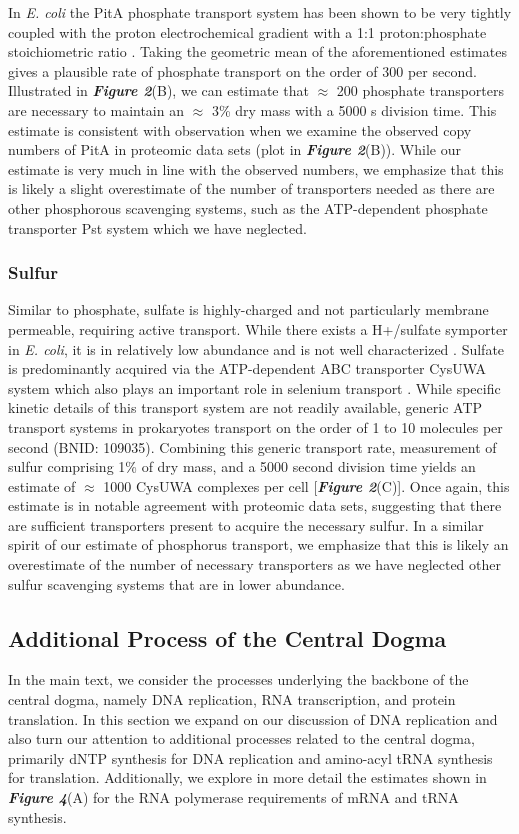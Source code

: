 In \textit{E. coli} the PitA phosphate transport system has been shown to be
very tightly coupled with the proton electrochemical gradient with a 1:1
proton:phosphate stoichiometric ratio \citep{harris2001, feist2007}. Taking the
geometric mean of the aforementioned estimates gives a plausible rate of
phosphate transport on the order of 300  per second. Illustrated in
\textbf{\textit{Figure 2}}(B), we can estimate that $\approx$ 200 phosphate
transporters are necessary to maintain an $\approx$ 3\% dry mass with a 5000 s
division time. This estimate is consistent with observation when we examine the
observed copy numbers of PitA in proteomic data sets (plot in
\textbf{\textit{Figure 2}}(B)). While our estimate is very much in line with the
observed numbers, we emphasize that this is likely a slight overestimate of the
number of transporters needed as there are other phosphorous scavenging systems,
such as the ATP-dependent phosphate transporter Pst system which we have
neglected.

\subsubsection{Sulfur}
Similar to phosphate, sulfate is highly-charged and not particularly membrane
permeable, requiring active transport. While there exists a H+/sulfate
symporter in \textit{E. coli}, it is in relatively low abundance and is not
well characterized \citep{zhang2014}. Sulfate is predominantly acquired via
the ATP-dependent ABC transporter CysUWA system which also plays an important
role in selenium transport \citep{sekowska2000, sirko1995}. While specific
kinetic details of this transport system are not readily available, generic
ATP transport systems in prokaryotes transport on the order of 1 to 10
molecules per second (BNID: 109035). Combining this generic transport rate,
measurement of sulfur comprising 1\% of dry mass, and a 5000 second division
time yields an estimate of $\approx$ 1000 CysUWA complexes per cell
[\textbf{\textit{Figure 2}}(C)]. Once again, this estimate is in notable
agreement with proteomic data sets, suggesting that there are sufficient
transporters present to acquire the necessary sulfur. In a similar spirit of
our estimate of phosphorus transport, we emphasize that this is likely an
overestimate of the number of necessary transporters as we have neglected
other sulfur scavenging systems that are in lower abundance.



\subsection{Additional Process of the Central Dogma}
\label{sec:SI_central_dogma}
In the main text, we consider the processes underlying the backbone of the
central dogma, namely DNA replication, RNA transcription, and protein
translation. In this section we expand on our discussion of DNA replication and also
turn our attention to additional processes
related to the central dogma, primarily dNTP synthesis for DNA replication and
amino-acyl tRNA synthesis for translation. Additionally, we explore in more
detail the estimates shown in \textbf{\textit{Figure 4}}(A) for the RNA polymerase
requirements of mRNA and tRNA synthesis.

